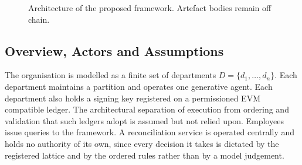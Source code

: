 \documentclass[journal]{IEEEtran}
\newcommand{\ico}[2]{\tikz[baseline=-0.62ex]{\pic{ic #1={#2}};}}
\begin{document}
\begin{figure}[!t]
\caption{Architecture of the proposed framework. Artefact bodies remain off chain.}
\label{fig:architecture}
\end{figure}

\subsection{Overview, Actors and Assumptions}

The organisation is modelled as a finite set of departments $D=\{d_1,\dots,d_n\}$. Each department maintains a partition and operates one generative agent. Each department also holds a signing key registered on a permissioned EVM compatible ledger. The architectural separation of execution from ordering and validation that such ledgers adopt \cite{androulaki2018fabric} is assumed but not relied upon. Employees issue queries to the framework. A reconciliation service is operated centrally and holds no authority of its own, since every decision it takes is dictated by the registered lattice and by the ordered rules rather than by a model judgement.
\end{document}
